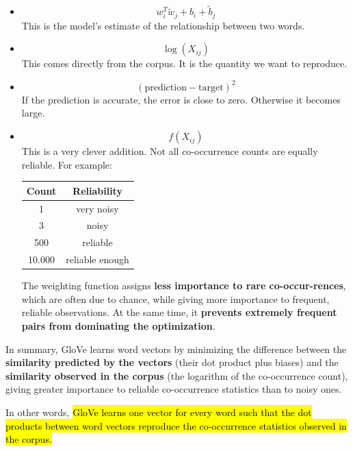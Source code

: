 \begin{itemize}
    \item {}
    \begin{equation*}
        w_i^T \tilde{w}_j + b_i + \tilde{b}_j
    \end{equation*}
    This is the model's estimate of the relationship between two words.
    \item {}
    \begin{equation*}
        \log \left(X_{ij}\right)
    \end{equation*}
    This comes directly from the corpus. It is the quantity we want to reproduce.
    \item {}
    \begin{equation*}
        \left(\text{prediction} - \text{target}\right)^{2}
    \end{equation*}
    If the prediction is accurate, the error is close to zero. Otherwise it becomes large.
    \item {}
    \begin{equation*}
        f\left(X_{ij}\right)
    \end{equation*}
    This is a very clever addition. Not all co-occurrence counts are equally reliable. For example:
    \begin{center}
        \begin{tabular}{@{} c c @{}}
            \toprule
            \textbf{Count} & \textbf{Reliability} \\
            \midrule
            1 & very noisy \\
            3 & noisy \\
            500 & reliable \\
            10.000 & reliable enough \\
            \bottomrule
        \end{tabular}
    \end{center}
    The weighting function assigns \textbf{less importance to rare co-occur-\break rences}, which are often due to chance, while giving more importance to frequent, reliable observations. At the same time, it \textbf{prevents extremely frequent pairs from dominating the optimization}.
\end{itemize}
In summary, GloVe learns word vectors by minimizing the difference between the \textbf{similarity predicted by the vectors} (their dot product plus biases) and the \textbf{similarity observed in the corpus} (the logarithm of the co-occurrence count), giving greater importance to reliable co-occurrence statistics than to noisy ones.

\highspace
In other words, \hl{GloVe learns one vector for every word such that the dot products between word vectors reproduce the co-occurrence statistics observed in the corpus.}